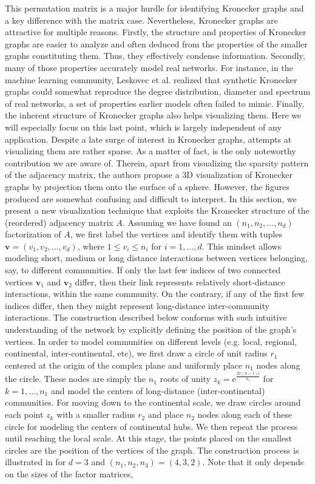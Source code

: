 \documentclass{article}
\numberwithin{equation}{section}
\theoremstyle{definition}
\begin{document}
This permutation matrix is a major hurdle for identifying Kronecker graphs and a key difference with the matrix case. Nevertheless, Kronecker graphs are attractive for multiple reasons. Firstly, the structure and properties of Kronecker graphs are easier to analyze and often deduced from the properties of the smaller graphs constituting them. Thus, they effectively condense information. Secondly, many of those properties accurately model real networks. For instance, in the machine learning community, Leskovec et al. \cite{leskovec2007scalable,leskovec2010kronecker} realized that synthetic Kronecker graphs could somewhat reproduce the degree distribution, diameter and spectrum of real networks, a set of properties earlier models often failed to mimic. Finally, the inherent structure of Kronecker graphs also helps visualizing them. Here we will especially focus on this last point, which is largely independent of any application. Despite a late surge of interest in Kronecker graphs, attempts at visualizing them are rather sparse. As a matter of fact, \cite[Chapter 11]{kepner2011graph} is the only noteworthy contribution we are aware of. Therein, apart from visualizing the sparsity pattern of the adjacency matrix, the authors propose a 3D visualization of Kronecker graphs by projection them onto the surface of a sphere. However, the figures produced are somewhat confusing and difficult to interpret. In this section, we present a new visualization technique that exploits the Kronecker structure of the (reordered) adjacency matrix $A$. Assuming we have found an $(n_1,n_2,\dots,n_d)$ factorization of $A$, we first label the vertices and identify them with tuples $\bm{v}=(v_1,v_2,\dots,v_d)$, where $1 \leq v_i \leq n_i$ for $i=1,\dots,d$. This mindset allows modeling short, medium or long distance interactions between vertices belonging, say, to different communities. If only the last few indices of two connected vertices $\bm{v}_1$ and $\bm{v}_2$ differ, then their link represents relatively short-distance interactions, within the same community. On the contrary, if any of the first few indices differ, then they might represent long-distance inter-community interactions. The construction described below conforms with such intuitive understanding of the network by explicitly defining the position of the graph's vertices. In order to model communities on different levels (e.g. local, regional, continental, inter-continental, etc), we first draw a circle of unit radius $r_1$ centered at the origin of the complex plane and uniformly place $n_1$ nodes along the circle. These nodes are simply the $n_1$ roots of unity $z_k = \mathrm{e}^{\frac{2 \pi (k-1) \mathrm{i}}{n_1}}$ for $k=1,\dots,n_1$ and model the centers of long-distance (inter-continental) communities. For moving down to the continental scale, we draw circles around each point $z_k$ with a smaller radius $r_2$ and place $n_2$ nodes along each of these circle for modeling the centers of continental hubs. We then repeat the process until reaching the local scale. At this stage, the points placed on the smallest circles are the position of the vertices of the graph. The construction process is illustrated in  for $d=3$ and $(n_1,n_2,n_3) = (4,3,2)$. Note that it only depends on the sizes of the factor matrices, 
\end{document}
